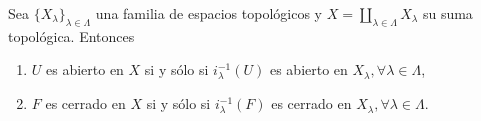 \begin{corollary}
Sea $\{ X_{\lambda} \}_{\lambda \in \Lambda}$ una familia de espacios topológicos y $X = \coprod_{\lambda \in \Lambda} X_{\lambda}$ su suma topológica. Entonces
\begin{enumerate}[label=\textnormal{(\roman*)}]
\item $U$ es abierto en $X$ si y sólo si $i^{-1}_{\lambda}(U)$ es abierto en $X_{\lambda}, \forall \lambda \in \Lambda$,
\item $F$ es cerrado en $X$ si y sólo si $i^{-1}_{\lambda}(F)$ es cerrado en $X_{\lambda}, \forall \lambda \in \Lambda$.
\end{enumerate}
\end{corollary}

